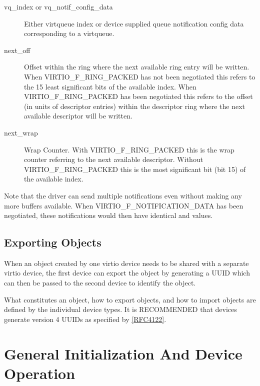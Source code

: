 \begin{description}
\item [vq_index or vq_notif_config_data] Either virtqueue index or device
      supplied queue notification config data corresponding to a virtqueue.
\item [next_off] Offset
      within the ring where the next available ring entry
      will be written.
      When VIRTIO_F_RING_PACKED has not been negotiated this refers to the
      15 least significant bits of the available index.
      When VIRTIO_F_RING_PACKED has been negotiated this refers to the offset
      (in units of descriptor entries)
      within the descriptor ring where the next available
      descriptor will be written.
\item [next_wrap] Wrap Counter.
      With VIRTIO_F_RING_PACKED this is the wrap counter
      referring to the next available descriptor.
      Without VIRTIO_F_RING_PACKED this is the most significant bit
      (bit 15) of the available index.
\end{description}

Note that the driver can send multiple notifications even without
making any more buffers available. When VIRTIO_F_NOTIFICATION_DATA
has been negotiated, these notifications would then have
identical  and  values.



\section{Exporting Objects}\label{sec:Basic Facilities of a Virtio Device / Exporting Objects}

When an object created by one virtio device needs to be
shared with a separate virtio device, the first device can
export the object by generating a UUID which can then
be passed to the second device to identify the object.

What constitutes an object, how to export objects, and
how to import objects are defined by the individual device
types. It is RECOMMENDED that devices generate version 4
UUIDs as specified by \hyperref[intro:rfc4122]{[RFC4122]}.




\chapter{General Initialization And Device Operation}\label{sec:General Initialization And Device Operation}

